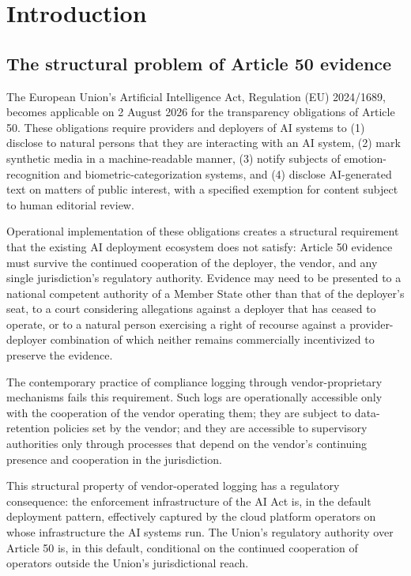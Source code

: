 \documentclass[11pt,a4paper]{article}
\begin{document}
\section{Introduction}

\subsection{The structural problem of Article 50 evidence}

The European Union's Artificial Intelligence Act, Regulation (EU) 2024/1689, becomes applicable on 2 August 2026 for the transparency obligations of Article 50. These obligations require providers and deployers of AI systems to (1) disclose to natural persons that they are interacting with an AI system, (2) mark synthetic media in a machine-readable manner, (3) notify subjects of emotion-recognition and biometric-categorization systems, and (4) disclose AI-generated text on matters of public interest, with a specified exemption for content subject to human editorial review.

Operational implementation of these obligations creates a structural requirement that the existing AI deployment ecosystem does not satisfy: Article 50 evidence must survive the continued cooperation of the deployer, the vendor, and any single jurisdiction's regulatory authority. Evidence may need to be presented to a national competent authority of a Member State other than that of the deployer's seat, to a court considering allegations against a deployer that has ceased to operate, or to a natural person exercising a right of recourse against a provider-deployer combination of which neither remains commercially incentivized to preserve the evidence.

The contemporary practice of compliance logging through vendor-proprietary mechanisms fails this requirement. Such logs are operationally accessible only with the cooperation of the vendor operating them; they are subject to data-retention policies set by the vendor; and they are accessible to supervisory authorities only through processes that depend on the vendor's continuing presence and cooperation in the jurisdiction.

This structural property of vendor-operated logging has a regulatory consequence: the enforcement infrastructure of the AI Act is, in the default deployment pattern, effectively captured by the cloud platform operators on whose infrastructure the AI systems run. The Union's regulatory authority over Article 50 is, in this default, conditional on the continued cooperation of operators outside the Union's jurisdictional reach.
\end{document}
